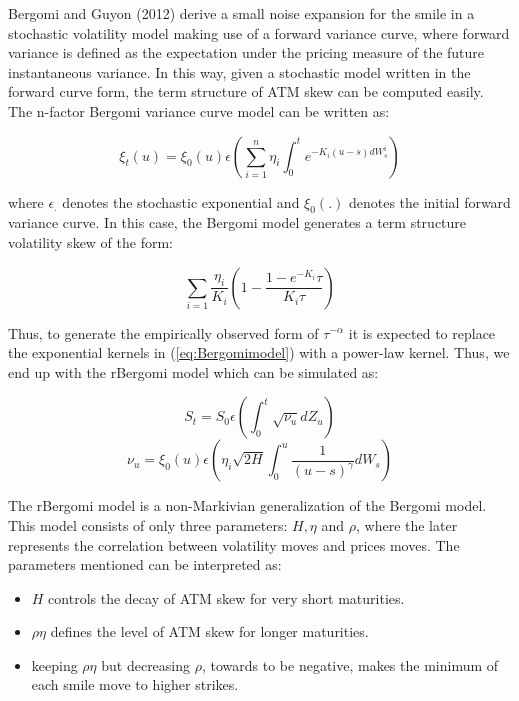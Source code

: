 \documentclass[12pt,oneside]{article}
\begin{document}
Bergomi and Guyon (2012) derive a small noise expansion for the smile in a stochastic volatility model making use of a forward variance curve, where forward variance is defined as the expectation under the pricing measure of the future instantaneous variance. In this way, given a stochastic model written in the forward curve form, the term structure of ATM skew can be computed easily. The n-factor Bergomi variance curve model can be written as:

\begin{equation}
\label{eq:Bergomimodel}
    \xi_{t}(u) = \xi_{0}(u) \epsilon(\sum_{i=1}^{n} \eta_{i} \int_{0}^{t} e^{-K_{i}(u-s) dW_{s}^{i}})
\end{equation}

where $\epsilon_{.}$ denotes the stochastic exponential and $\xi_{0}(.)$ denotes the initial forward variance curve. In this case, the Bergomi model generates a term structure volatility skew of the form:

$$\sum_{i=1}^{} \frac{\eta_{i}}{K_{i}} (1- \frac{1-e^{-K_{i}} \tau}{{K_{i}} \tau})$$

Thus, to generate the empirically observed form of $\tau^{-\alpha}$ it is expected to replace the exponential kernels in (\ref{eq:Bergomimodel}) with a power-law kernel. Thus, we end up with the rBergomi model which can be simulated as:

\begin{equation}
    S_{t} = S_{0} \epsilon (\int_{0}^{t} \sqrt{\nu_{u}} dZ_{u})
\end{equation}
\begin{equation}
    \nu_{u} = \xi_{0}(u) \epsilon( \eta_{i} \sqrt{2H} \int_{0}^{u} \frac{1}{(u-s)^{\gamma}} dW_{s})
\end{equation}

The rBergomi model is a non-Markivian generalization of the Bergomi model. This model consists of only three parameters: $H, \eta$ and $\rho$, where the later represents the correlation between volatility moves and prices moves. The parameters mentioned can be interpreted as:

\begin{itemize}
    \item $H$ controls the decay of ATM skew for very short maturities.
    \item $\rho \eta$ defines the level of ATM skew for longer maturities.
    \item keeping $\rho \eta$ but decreasing $\rho$, towards to be negative, makes the minimum of each smile move to higher strikes.
\end{itemize}
\end{document}
